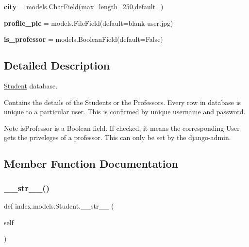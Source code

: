 \begin{DoxyCompactItemize}
{\bfseries city} = models.\+Char\+Field(max\+\_\+length=250,default=\textquotesingle{}\textquotesingle{})
\item 
\mbox{\label{classindex_1_1models_1_1Student_aef0887df6bb0d59e9adbbb0778dea3e0}} 
{\bfseries profile\+\_\+pic} = models.\+File\+Field(default=\textquotesingle{}blank-\/user.\+jpg\textquotesingle{})
\item 
\mbox{\label{classindex_1_1models_1_1Student_ad4b4c126adac9e0b610dbe8b4c52a1f8}} 
{\bfseries is\+\_\+professor} = models.\+Boolean\+Field(default=False)
\end{DoxyCompactItemize}


\subsection{Detailed Description}
\hyperlink{classindex_1_1models_1_1Student}{Student} database. 

Contains the details of the Students or the Professors. Every row in database is unique to a particular user. This is confirmed by unique username and password. \begin{DoxyNote}{Note}
is\+Professor is a Boolean field. If checked, it means the corresponding User gets the priveleges of a professor. This can only be set by the django-\/admin. 
\end{DoxyNote}


\subsection{Member Function Documentation}
\mbox{\label{classindex_1_1models_1_1Student_abf610ed89f9af9fc46ab4bd4b7f96b27}} 
\subsubsection{\texorpdfstring{\+\_\+\+\_\+str\+\_\+\+\_\+()}{\_\_str\_\_()}}
{\footnotesize\ttfamily def index.\+models.\+Student.\+\_\+\+\_\+str\+\_\+\+\_\+ (\begin{DoxyParamCaption}\item[{}]{self }\end{DoxyParamCaption})}



